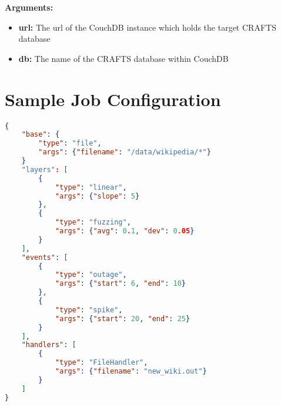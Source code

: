 \textbf{Arguments:}
\begin{itemize}
\item \textbf{url:} The url of the CouchDB instance which holds the target CRAFTS database
\item \textbf{db:} The name of the CRAFTS database within CouchDB
\end{itemize}

\section{Sample Job Configuration}
\begin{lstlisting}[language=json]
{
    "base": {
        "type": "file",
        "args": {"filename": "/data/wikipedia/*"}
    }
    "layers": [
        {
            "type": "linear",
            "args": {"slope": 5}
        },
        {
            "type": "fuzzing",
            "args": {"avg": 0.1, "dev": 0.05}
        }
    ],
    "events": [
        {
            "type": "outage",
            "args": {"start": 6, "end": 10}
        },
        {
            "type": "spike",
            "args": {"start": 20, "end": 25}
        }
    ],
    "handlers": [
        {
            "type": "FileHandler",
            "args": {"filename": "new_wiki.out"}
        }
    ]
}
\end{lstlisting}
